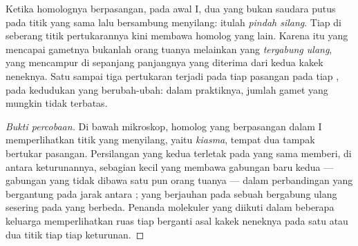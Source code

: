\begin{proposition}\label{prop:g12:meiosis-genetic-shuffling:crossingover}
Ketika homolognya berpasangan, pada awal  I, dua  yang
bukan saudara putus pada titik yang sama lalu bersambung menyilang:
itulah \emph{pindah silang}. Tiap  di
seberang titik pertukarannya kini membawa  homolog yang lain.
Karena itu  yang mencapai gametnya bukanlah  orang
tuanya melainkan  yang \emph{tergabung ulang}, yang mencampur
di sepanjang panjangnya  yang diterima dari kedua kakek neneknya.
Satu sampai tiga pertukaran terjadi pada tiap pasangan pada tiap
, pada kedudukan yang berubah-ubah: dalam praktiknya, jumlah
gamet yang mungkin tidak terbatas.
\end{proposition}
\begin{proof}[Bukti percobaan]
Di bawah mikroskop, homolog yang berpasangan dalam  I
memperlihatkan titik yang menyilang, yaitu \emph{kiasma}, tempat dua
 tampak bertukar pasangan. Persilangan yang kedua 
terletak pada  yang sama memberi, di antara keturunannya,
sebagian kecil yang membawa gabungan baru  kedua  ---
gabungan yang tidak dibawa satu pun orang tuanya --- dalam perbandingan
yang bergantung pada jarak antara ;  yang berjauhan pada
sebuah  bergabung ulang sesering  pada  yang
berbeda. Penanda molekuler yang diikuti dalam beberapa keluarga
memperlihatkan ruas tiap  berganti asal kakek neneknya pada
satu atau dua titik tiap  tiap keturunan.
\end{proof}

